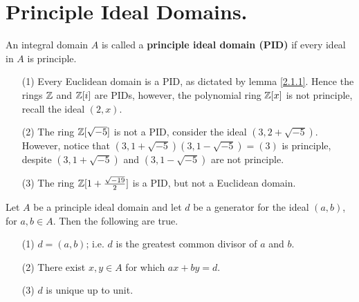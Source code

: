 \section{Principle Ideal Domains.}

\begin{definition}
    An integral domain $A$ is called a \textbf{principle ideal domain (PID)} if
    every ideal in $A$ is principle.
\end{definition}

\begin{example}\label{2.4}
    \begin{enumerate}
        \item[(1)] Every Euclidean domain is a PID, as dictated by lemma
            \ref{2.1.1}. Hence the rings $\mathbb{Z}$ and  $\mathbb{Z}[i]$ are PIDs, however,
            the polynomial ring $\mathbb{Z}[x]$ is not principle, recall the ideal
            $(2,x)$.

        \item[(2)] The ring $\mathbb{Z}[\sqrt{-5}]$ is not a PID, consider the ideal
            $(3,2+\sqrt{-5})$. However, notice that
            $(3,1+\sqrt{-5})(3,1-\sqrt{-5})=(3)$ is principle, despite
            $(3,1+\sqrt{-5})$ and $(3,1-\sqrt{-5})$ are not principle.

        \item[(3)] The ring $\mathbb{Z}[1+\frac{\sqrt{-19}}{2}]$ is a PID, but not a
            Euclidean domain.
    \end{enumerate}
\end{example}

\begin{lemma}\label{2.2.1}
    Let $A$ be a principle ideal domain and let $d$ be a generator for the ideal
    $(a,b)$, for $a,b \in A$. Then the following are true.
    \begin{enumerate}
        \item[(1)] $d=(a,b)$; i.e. $d$ is the greatest common divisor of $a$ and
            $b$.

        \item[(2)] There exist $x,y \in A$ for which  $ax+by=d$.

        \item[(3)] $d$ is unique up to unit.
    \end{enumerate}
\end{lemma}

